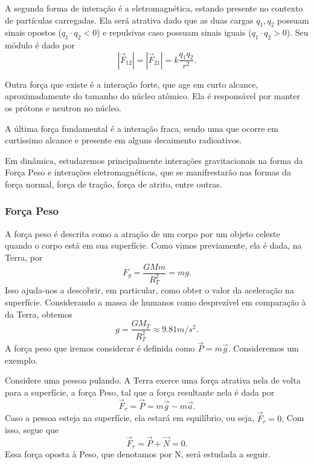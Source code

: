 \documentclass[PhysicsI/physics_notes.tex]{subfiles}
\begin{document}
A segunda forma de interação é a eletromagnética, estando presente no contexto de partículas carregadas. Ela será
atrativa dado que as duas cargas $q_{1}, q_{2}$ possuam sinais opostos ($q_{1}\cdot q_{2}<0$) e repulsivas caso possuam sinais
iguais ($q_{1}\cdot q_{2}>0$). Seu módulo é dado por
$$
	|\vec{F}_{12}|=|\vec{F}_{21}|=k\frac{q_{1}q_{2}}{r^{2}}.
$$

Outra força que existe é a interação forte, que age em curto alcance, aproximadamente do tamanho do núcleo atômico.
Ela é responsável por manter os prótons e neutron no núcleo.

A última força fundamental é a interação fraca, sendo uma que ocorre em curtíssimo alcance e presente em alguns
decaimento radioativos.

Em dinâmica, estudaremos principalmente interações gravitacionais na forma da Força Peso e interações eletromagnéticas,
que se manifrestarão nas formas da força normal, força de tração, força de atrito, entre outras.

\subsubsection{Força Peso}
A força peso é descrita como a atração de um corpo por um objeto celeste quando o corpo está em sua superfície.
Como vimos previamente, ela é dada, na Terra, por
$$
	F_{g} = \frac{GMm}{R_{T}^{2}} = mg.
$$
Isso ajuda-nos a descobrir, em particular, como obter o valor da aceleração na superfície. Considerando a massa
de humanos como desprezível em comparação à da Terra, obtemos
$$
	g = \frac{GM_{T}}{R_{T}^{2}}\approx 9.81m/s^{2}.
$$
A força peso que iremos considerar é definida como $\vec{P} = m \vec{g}$. Consideremos um exemplo.

\begin{example}
	Considere uma pessoa pulando. A Terra exerce uma força atrativa nela de volta para a superfície, a força Peso, tal que
	a força resultante nela é dada por
	$$
		\vec{F}_r = \vec{P} = m \vec{g} - m \vec{a}.
	$$
	Caso a pessoa esteja na superfície, ela estará em equilíbrio, ou seja, $\vec{F}_{r} = 0.$ Com isso, segue que
	$$
		\vec{F}_{r} = \vec{P} + \vec{N} = 0.
	$$
	Essa força oposta à Peso, que denotamos por N, será estudada a seguir.
\end{example}
\end{document}
